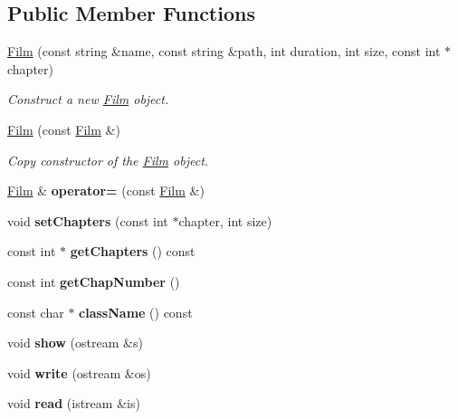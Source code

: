 \subsection*{Public Member Functions}
\begin{DoxyCompactItemize}
\item 
\mbox{\hyperlink{class_film_acbea47f801a1c038a266922bb50b90c5}{Film}} (const string \&name, const string \&path, int duration, int size, const int $\ast$chapter)
\begin{DoxyCompactList}\small\item\em Construct a new \mbox{\hyperlink{class_film}{Film}} object. \end{DoxyCompactList}\item 
\mbox{\hyperlink{class_film_a34c9de2efb9554ce1192e4110d98806b}{Film}} (const \mbox{\hyperlink{class_film}{Film}} \&)
\begin{DoxyCompactList}\small\item\em Copy constructor of the \mbox{\hyperlink{class_film}{Film}} object. \end{DoxyCompactList}\item 
\mbox{\label{class_film_a2691ad8cf20210033cc35a6aa28e8553}} 
\mbox{\hyperlink{class_film}{Film}} \& {\bfseries operator=} (const \mbox{\hyperlink{class_film}{Film}} \&)
\item 
\mbox{\label{class_film_a7e21757cca760f99dd0bdd5857b20af8}} 
void {\bfseries set\+Chapters} (const int $\ast$chapter, int size)
\item 
\mbox{\label{class_film_a7bdcc9cb81df92862f98b3b6b286ab4a}} 
const int $\ast$ {\bfseries get\+Chapters} () const
\item 
\mbox{\label{class_film_a312be28a44c85daf94f86164c64cd83d}} 
const int {\bfseries get\+Chap\+Number} ()
\item 
\mbox{\label{class_film_a057657b26f710f1c8d5e8782668c7468}} 
const char $\ast$ {\bfseries class\+Name} () const
\item 
\mbox{\label{class_film_a7bb425655e5334ae5757b6f03b5c73a4}} 
void {\bfseries show} (ostream \&s)
\item 
\mbox{\label{class_film_a5c2b9cb5c289e95e254e2bda8a5ad273}} 
void {\bfseries write} (ostream \&os)
\item 
\mbox{\label{class_film_ac2a4fb9a82e62bc7ffc728461d1d829d}} 
void {\bfseries read} (istream \&is)
\end{DoxyCompactItemize}


